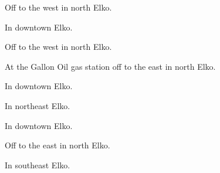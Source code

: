 

\begin{LocationList}

Off  to the west in north Elko.

In downtown Elko.

Off  to the west in north Elko.

At the Gallon Oil gas station off  to the east in north Elko.

\Location{\GarageHQ \Garage}
In downtown Elko.

In northeast Elko.

In downtown Elko.

Off  to the east in north Elko.

In southeast Elko.

\end{LocationList}
